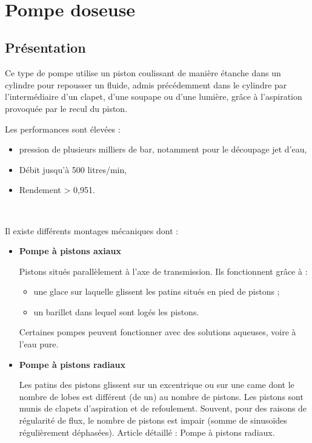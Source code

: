 \newpage

~\

\newpage

\section{Pompe doseuse}

\subsection{Présentation}

Ce type de pompe utilise un piston coulissant de manière étanche dans un cylindre pour repousser un fluide, admis précédemment dans le cylindre par l'intermédiaire d'un clapet, d'une soupape ou d'une lumière, grâce à l'aspiration provoquée par le recul du piston.

Les performances sont élevées :
\begin{itemize}
 \item pression de plusieurs milliers de bar, notamment pour le découpage jet d'eau,
 \item Débit jusqu'à 500 litres/min,
 \item Rendement > 0,951.
\end{itemize}

~\

Il existe différents montages mécaniques dont :
\begin{itemize}
 \item \textbf{Pompe à pistons axiaux}

 Pistons situés parallèlement à l'axe de transmission. Ils fonctionnent grâce à :
\begin{itemize}
 \item une glace sur laquelle glissent les patins situés en pied de pistons ;
 \item un barillet dans lequel sont logés les pistons.
\end{itemize}
Certaines pompes peuvent fonctionner avec des solutions aqueuses, voire à l'eau pure.
 
 \item \textbf{Pompe à pistons radiaux}

Les patins des pistons glissent sur un excentrique ou sur une came dont le nombre de lobes est différent (de un) au nombre de pistons. Les pistons sont munis de clapets d'aspiration et de refoulement. Souvent, pour des raisons de régularité de flux, le nombre de pistons est impair (somme de sinusoïdes régulièrement déphasées).
Article détaillé : Pompe à pistons radiaux.
\end{itemize}

